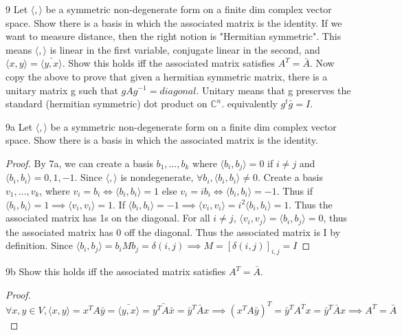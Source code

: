 \documentclass{article}
\newcommand{\C}{\mathbb{C}}
\newcommand{\angles}[1]{\langle #1 \rangle}
\begin{document}
\bigskip

\begin{PROB}{9}\label{Problem 9.}
    Let $\angles{,}$  be a symmetric non-degenerate form on a finite dim complex vector space. Show there is a basis in which the associated matrix is the identity. If we want to measure distance, then the right notion is "Hermitian symmetric". This means $\angles{,}$ is linear in the first variable, conjugate linear in the second, and $\angles{x, y} = \bar{\angles{y, x}}$. Show this holds iff the associated matrix satisfies $A^T = \bar A$.  Now copy the above to prove that given a hermitian symmetric matrix, there is a unitary matrix g such that $g A g^{-1} = diagonal$. Unitary means that g preserves the standard (hermitian symmetric) dot product on $\C^n$. equivalently   $g^t \bar g = I.$  
\end{PROB}
\begin{claim}{9a}\label{Claim 9a.}
    Let $\angles{,}$  be a symmetric non-degenerate form on a finite dim complex vector space. Show there is a basis in which the associated matrix is the identity.
\end{claim}
\begin{proof}
    By 7a, we can create a basis $b_1, \dots, b_k$ where $\angles{b_i, b_j} = 0$ if $i \neq j$  and $\angles{b_i, b_i} = 0, 1, -1$. Since $\angles{ , }$ is nondegenerate, $\forall b_i, \angles{b_i, b_i} \neq 0$. Create a basis $v_1, \dots, v_k$, where $v_i = b_i \iff \angles{b_i, b_i} = 1$ else $v_i = ib_i \iff \angles{b_i, b_i} = -1$. Thus if $\angles{b_i, b_i} = 1 \implies \angles{v_i, v_i} = 1$. If $\angles{b_i, b_i} = -1 \implies \angles{v_i, v_i} = i^2 \angles{b_i, b_i} = 1$. Thus the associated matrix has 1s on the diagonal. For all $i \neq j$, $\angles{v_i, v_j} = \angles{b_i, b_j} = 0$, thus the associated matrix has 0 off the diagonal. Thus the associated matrix is I by definition. Since $\angles{b_i, b_j} = b_i M b_j = \delta(i, j) \implies M = [\delta(i, j)]_{i, j} = I$               
\end{proof}

\begin{claim}{9b}\label{Claim 9b.}
    Show this holds iff the associated matrix satisfies $A^T = \bar A$.
\end{claim}
\begin{proof}
    $\forall x, y \in V, \angles{x, y} = x^T A \bar{y} = \bar{\angles{y, x}} = \bar{y^T A \bar x} = \bar{y}^T \bar{A} x \implies (x^T A \bar{y})^T = \bar{y}^T A^T x = \bar{y}^T \bar{A} x \implies A^T = \bar A$ 
\end{proof}
\end{document}
